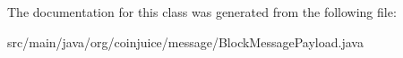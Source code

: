 The documentation for this class was generated from the following file\-:\begin{DoxyCompactItemize}
\item 
src/main/java/org/coinjuice/message/Block\-Message\-Payload.\-java\end{DoxyCompactItemize}
